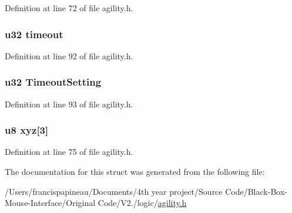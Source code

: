 \-Definition at line 72 of file agility.\-h.

\hypertarget{structagil_aab0b8a4320e771becf663b000c2cd7e1}{
\subsubsection[{timeout}]{\setlength{\rightskip}{0pt plus 5cm}u32 {\bf timeout}}}\label{structagil_aab0b8a4320e771becf663b000c2cd7e1}


\-Definition at line 92 of file agility.\-h.

\hypertarget{structagil_a20960b675c12b40c0761d99bd95661c8}{
\subsubsection[{\-Timeout\-Setting}]{\setlength{\rightskip}{0pt plus 5cm}u32 {\bf \-Timeout\-Setting}}}\label{structagil_a20960b675c12b40c0761d99bd95661c8}


\-Definition at line 93 of file agility.\-h.

\hypertarget{structagil_af9cba48daaf1e24eb2df884547c0efcc}{
\subsubsection[{xyz}]{\setlength{\rightskip}{0pt plus 5cm}u8 {\bf xyz}\mbox{[}3\mbox{]}}}\label{structagil_af9cba48daaf1e24eb2df884547c0efcc}


\-Definition at line 75 of file agility.\-h.



\-The documentation for this struct was generated from the following file\-:\begin{DoxyCompactItemize}
\item 
/\-Users/francispapineau/\-Documents/4th year project/\-Source Code/\-Black-\/\-Box-\/\-Mouse-\/\-Interface/\-Original Code/\-V2./logic/\hyperlink{agility_8h}{agility.\-h}\end{DoxyCompactItemize}
